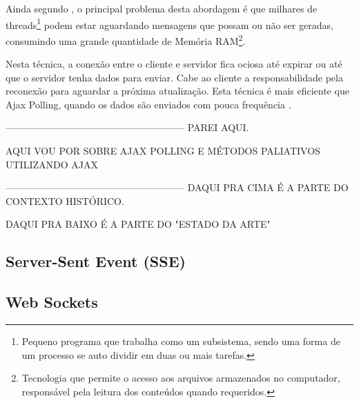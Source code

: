 Ainda segundo , o principal problema desta abordagem é que milhares de threads\footnote{Pequeno programa que trabalha como um subsistema, sendo uma forma de um processo se auto dividir em duas ou mais tarefas.} podem estar aguardando mensagens que possam ou não ser geradas, consumindo uma grande quantidade de Memória RAM\footnote{Tecnologia que permite o acesso aos arquivos armazenados no computador, responsável pela leitura dos conteúdos quando requeridos.}.

Nesta técnica, a conexão entre o cliente e servidor fica ociosa até expirar ou até que o servidor tenha dados para enviar. Cabe ao cliente a responsabilidade pela reconexão para aguardar a próxima atualização. Esta técnica é mais eficiente que Ajax Polling, quando os dados são enviados com pouca frequência \cite{gutwin2011real}.





--------------------------------------------------------
PAREI AQUI.

AQUI VOU POR SOBRE AJAX POLLING E MÉTODOS PALIATIVOS UTILIZANDO AJAX


--------------------------------------------------------
DAQUI PRA CIMA É A PARTE DO CONTEXTO HISTÓRICO.

DAQUI PRA BAIXO É A PARTE DO "ESTADO DA ARTE"

\subsection{Server-Sent Event (SSE)}

\subsection{Web Sockets}

